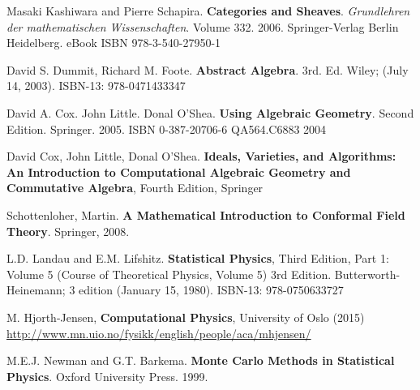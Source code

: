 \documentclass[10pt]{amsart}
\begin{document}
\begin{thebibliography}{9}

Masaki Kashiwara and Pierre Schapira. \textbf{Categories and Sheaves}.  \emph{Grundlehren der mathematischen Wissenschaften}.  Volume 332.  2006. Springer-Verlag Berlin Heidelberg.  eBook ISBN 978-3-540-27950-1


David S. Dummit, Richard M. Foote. \textbf{Abstract Algebra}. 3rd. Ed.  Wiley; (July 14, 2003). ISBN-13: 978-0471433347 
 

David A. Cox.  John Little. Donal O'Shea. \textbf{Using Algebraic Geometry}.  Second Edition.  Springer.  2005.  ISBN 0-387-20706-6 QA564.C6883 2004

David Cox, John Little, Donal O'Shea. \textbf{Ideals, Varieties, and Algorithms: An Introduction to Computational Algebraic Geometry and Commutative Algebra}, Fourth Edition, Springer

Schottenloher, Martin.  \textbf{A Mathematical Introduction to Conformal Field Theory}.  Springer, 2008.  

L.D. Landau and E.M. Lifshitz.  \textbf{Statistical Physics}, Third Edition, Part 1: Volume 5 (Course of Theoretical Physics, Volume 5) 3rd Edition.  Butterworth-Heinemann; 3 edition (January 15, 1980).  ISBN-13: 978-0750633727

M. Hjorth-Jensen, \textbf{Computational Physics}, University of Oslo (2015) \url{http://www.mn.uio.no/fysikk/english/people/aca/mhjensen/}



M.E.J. Newman and G.T. Barkema.  \textbf{Monte Carlo Methods in Statistical Physics}.  Oxford University Press.  1999.  



\end{thebibliography}
\end{document}
